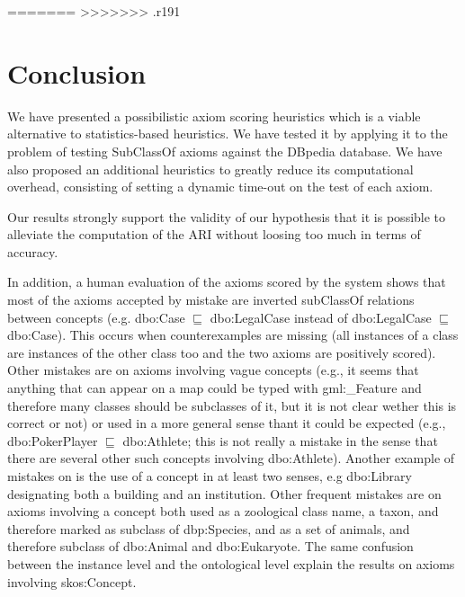 \documentclass{sig-alternate}
\begin{document}
=======
>>>>>>> .r191
\section{Conclusion}

We have presented a possibilistic axiom scoring heuristics which is a viable
alternative to statistics-based heuristics. We have tested it by applying it to the
problem of testing \textsf{SubClassOf} axioms against the DBpedia database.
We have also proposed an additional heuristics to greatly reduce its computational
overhead, consisting of setting a dynamic time-out on the test of each axiom.

Our results strongly support the validity of our hypothesis
that it is possible to alleviate the computation of the ARI without loosing too much
in terms of accuracy.

In addition, a human evaluation of the axioms scored by the system shows that
most of the axioms accepted by mistake are inverted \textsf{subClassOf} relations between concepts (e.g. \textsf{dbo:Case} $\sqsubseteq$ \textsf{dbo:LegalCase} instead of \textsf{dbo:LegalCase} $\sqsubseteq$ \textsf{dbo:Case}). This occurs when counterexamples are missing (all instances of a class are instances of the other class too and the two axioms are positively scored).
Other mistakes are on axioms involving vague concepts (e.g., it seems that anything that can appear on a map could be typed with \textsf{gml:\_Feature} and therefore many classes should be subclasses of it, but it is not clear wether this is correct or not) or used in a more general sense thant it could be expected (e.g., \textsf{dbo:PokerPlayer} $\sqsubseteq$ \textsf{dbo:Athlete}; this is not really a mistake in the sense that there are several other such concepts involving \textsf{dbo:Athlete}).
Another example of mistakes on is the use of a concept in at least two senses, e.g \textsf{dbo:Library} designating both a building and an institution.
Other frequent mistakes are on axioms involving a concept both used as a zoological class name, a taxon, and therefore marked as subclass of \textsf{dbp:Species}, and as a set of animals, and therefore subclass of \textsf{dbo:Animal} and \textsf{dbo:Eukaryote}.
The same confusion between the instance level and the ontological level explain the results on axioms involving \textsf{skos:Concept}.
 
\end{document}
